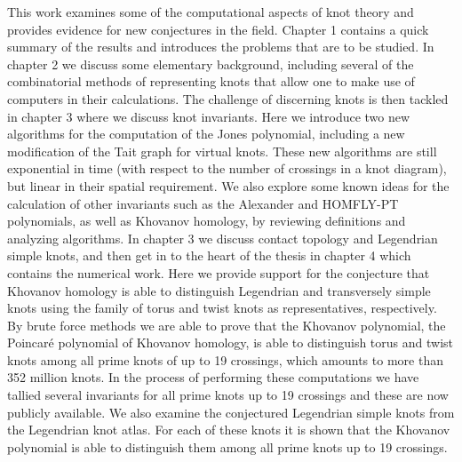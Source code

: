 This work examines some of the computational aspects of knot theory and
provides evidence for new conjectures in the field. Chapter 1 contains a quick
summary of the results and introduces the problems that are to be studied.
In chapter 2 we discuss some elementary background, including several of the
combinatorial methods of representing knots that allow one to make use of
computers in their calculations. The challenge of discerning knots is then
tackled in chapter 3 where we discuss knot invariants. Here we introduce two
new algorithms for the computation of the Jones polynomial,
including a new modification of the Tait graph for virtual knots.
These new algorithms are still exponential in time (with respect to the number
of crossings in a knot diagram), but linear in their spatial requirement.
We also explore some known ideas for the calculation
of other invariants such as the Alexander and HOMFLY-PT polynomials, as well as
Khovanov homology, by reviewing definitions and analyzing algorithms.
In chapter 3 we discuss contact topology and Legendrian
simple knots, and then get in to the heart of
the thesis in chapter 4 which contains the numerical work. Here we provide
support for the conjecture that Khovanov homology is able to distinguish
Legendrian and transversely simple knots using the family of torus and twist knots as
representatives, respectively. By brute force methods we are able to prove that
the Khovanov polynomial, the Poincar\'{e} polynomial of Khovanov homology, is
able to distinguish torus and twist knots among all prime knots of up to 19
crossings, which amounts to more than 352 million knots. In the process of
performing these computations we have tallied several invariants for all
prime knots up to 19 crossings and these are now publicly available. We also
examine the conjectured Legendrian simple knots from the Legendrian knot atlas.
For each of these knots it is shown that the Khovanov polynomial is able to
distinguish them among all prime knots up to 19 crossings.
